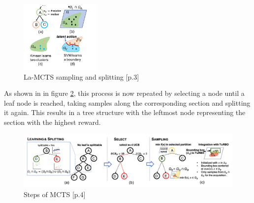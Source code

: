 \documentclass[bibliography=totoc]{scrartcl}
\begin{document}
\begin{figure}[H]
	\centering
	\includegraphics[width = {0.35\textwidth}]{img/lamcts_1.png}
	\caption{\ac{La-MCTS} sampling and splitting \cite{La-MCTS}[p.3]}
	\label{fig:laMCTS_sampling_plitting}
\end{figure}
As shown in in figure \ref{fig:laMCTS_workflow}, this process is now repeated by selecting a node until a leaf node is reached, taking samples along the corresponding section and splitting it again. 
This results in a tree structure with the leftmost node representing the section with the highest reward. 

\begin{figure}[H]
	\centering
	\includegraphics[width = {\textwidth}]{img/lamcts_workflow.png}
	\caption{Steps of \ac{MCTS} \cite{La-MCTS}[p.4]}
	\label{fig:laMCTS_workflow}
\end{figure}

\end{document}
